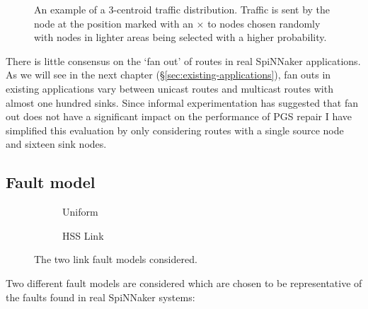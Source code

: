 			\begin{figure}
				\center
				
				\caption[An example of a 3-centroid traffic distribution.]%
				{An example of a 3-centroid traffic distribution. Traffic is
				sent by the node at the position marked with an {\color{red}$\times$}
				to nodes chosen randomly with nodes in lighter areas being selected
				with a higher probability.}
				\label{fig:traffic-distribution-centroids}
			\end{figure}
			
			There is little consensus on the `fan out' of routes in real SpiNNaker
			applications. As we will see in the next chapter
			(\S\ref{sec:existing-applications}), fan outs in existing applications
			vary between unicast routes and multicast routes with almost one hundred
			sinks. Since informal experimentation has suggested that fan out does not
			have a significant impact on the performance of PGS repair I have
			simplified this evaluation by only considering routes with a single
			source node and sixteen sink nodes.
		
		\subsection{Fault model}
			
			\begin{figure}
				\center
				\begin{subfigure}{0.48\linewidth}
					\hspace*{-0.5cm}
					
					\caption{Uniform}
					\label{fig:fault-example-uniform}
				\end{subfigure}
				\begin{subfigure}{0.48\linewidth}
					\hspace*{-0.5cm}
					
					\caption{HSS Link}
					\label{fig:fault-example-hss}
				\end{subfigure}
				
				\caption{The two link fault models considered.}
				\label{fig:fault-example}
			\end{figure}
			
			Two different fault models are considered which are chosen to be
			representative of the faults found in real SpiNNaker systems:
			
